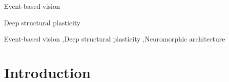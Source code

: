 \documentclass[preprint,12pt]{elsarticle}
\begin{document}
\begin{frontmatter}
\begin{abstract}
\end{abstract}


\begin{highlights}
\item Event-based vision
\item Deep structural plasticity
\end{highlights}

\begin{keyword}
Event-based vision \sep Deep structural plasticity \sep Neuromorphic architecture


\end{keyword}

\end{frontmatter}



\section{Introduction}
\end{document}
